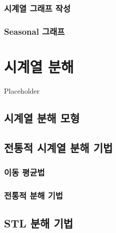 \documentclass[
]{book}
\begin{document}
\hypertarget{section-ts-plot}{%
\subsection{시계열 그래프 작성}\label{section-ts-plot}}

\hypertarget{section-seasonal-plot}{%
\subsection{Seasonal 그래프}\label{section-seasonal-plot}}

\hypertarget{uxc2dcuxacc4uxc5f4-uxbd84uxd574}{%
\chapter{시계열 분해}\label{uxc2dcuxacc4uxc5f4-uxbd84uxd574}}

Placeholder

\hypertarget{uxc2dcuxacc4uxc5f4-uxbd84uxd574-uxbaa8uxd615}{%
\section{시계열 분해 모형}\label{uxc2dcuxacc4uxc5f4-uxbd84uxd574-uxbaa8uxd615}}

\hypertarget{uxc804uxd1b5uxc801-uxc2dcuxacc4uxc5f4-uxbd84uxd574-uxae30uxbc95}{%
\section{전통적 시계열 분해 기법}\label{uxc804uxd1b5uxc801-uxc2dcuxacc4uxc5f4-uxbd84uxd574-uxae30uxbc95}}

\hypertarget{uxc774uxb3d9-uxd3c9uxade0uxbc95}{%
\subsection{이동 평균법}\label{uxc774uxb3d9-uxd3c9uxade0uxbc95}}

\hypertarget{uxc804uxd1b5uxc801-uxbd84uxd574-uxae30uxbc95}{%
\subsection{전통적 분해 기법}\label{uxc804uxd1b5uxc801-uxbd84uxd574-uxae30uxbc95}}

\hypertarget{stl-uxbd84uxd574-uxae30uxbc95}{%
\section{STL 분해 기법}\label{stl-uxbd84uxd574-uxae30uxbc95}}
\end{document}
